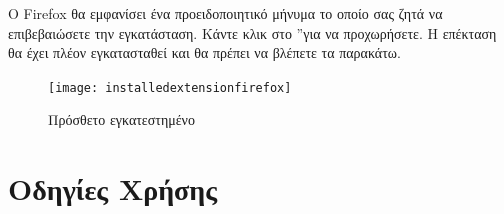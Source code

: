 \documentclass{article}
\begin{document}
Ο Firefox θα εμφανίσει ένα προειδοποιητικό μήνυμα το οποίο σας ζητά να επιβεβαιώσετε την εγκατάσταση. Κάντε κλικ στο \textquotedblright για να προχωρήσετε. Η επέκταση θα έχει πλέον εγκατασταθεί και θα πρέπει να βλέπετε τα παρακάτω.

\begin{figure}[H]
    \texttt{[image: installedextensionfirefox]}
    \caption*{Πρόσθετο εγκατεστημένο}
\end{figure}

\section*{Οδηγίες Χρήσης}
\end{document}
